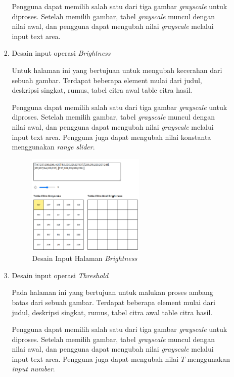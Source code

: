 \begin{enumerate}[leftmargin=1cm, itemindent=0.6cm,labelwidth=15pt, labelsep=5pt, listparindent=1cm,align=left]
\begin{enumerate}[leftmargin=1cm, itemindent=0.6cm,labelwidth=15pt, labelsep=5pt, listparindent=1cm,align=left]
\begin{enumerate}[leftmargin=1cm, itemindent=0.6cm,labelwidth=15pt, labelsep=5pt, listparindent=1cm,align=left]
Pengguna dapat memilih salah satu dari tiga gambar \textit{grayscale} untuk diproses. Setelah memilih gambar, tabel \textit{grayscale} muncul dengan nilai awal, dan pengguna dapat mengubah nilai \textit{grayscale} melalui input text area.

    \item Desain input operasi \textit{Brightness}

Untuk halaman ini yang bertujuan untuk mengubah kecerahan dari sebuah gambar. Terdapat beberapa element mulai dari judul, deskripsi singkat, rumus, tabel citra awal table citra hasil.

Pengguna dapat memilih salah satu dari tiga gambar \textit{grayscale} untuk diproses. Setelah memilih gambar, tabel \textit{grayscale} muncul dengan nilai awal, dan pengguna dapat mengubah nilai \textit{grayscale} melalui input text area. Pengguna juga dapat mengubah nilai konstanta menggunakan \textit{range slider}.

          \begin{figure}[ht]
    	      \includegraphics[width=0.6\textwidth, center]{images/input-brightness.png}
              \caption{Desain Input Halaman \textit{Brightness}}
          \end{figure}

    \item Desain input operasi \textit{Threshold}

Pada halaman ini yang bertujuan untuk malukan proses ambang batas dari sebuah gambar. Terdapat beberapa element mulai dari judul, deskripsi singkat, rumus, tabel citra awal table citra hasil.

Pengguna dapat memilih salah satu dari tiga gambar \textit{grayscale} untuk diproses. Setelah memilih gambar, tabel \textit{grayscale} muncul dengan nilai awal, dan pengguna dapat mengubah nilai \textit{grayscale} melalui input text area. Pengguna juga dapat mengubah nilai \(T\) menggunakan \textit{input number}.


\end{enumerate}
\end{enumerate}
\end{enumerate}
